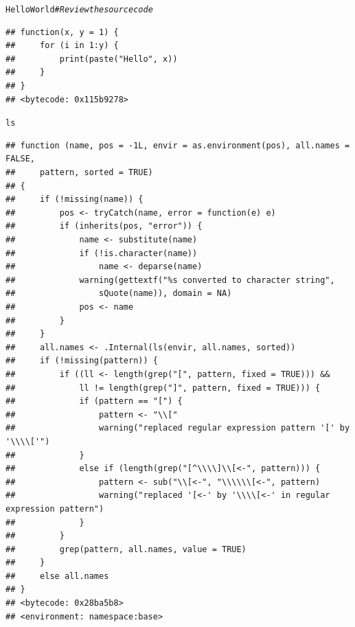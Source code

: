 \documentclass{beamer}\usepackage[]{graphicx}\usepackage[]{color}
\makeatletter
\newcommand{\hlcom}[1]{\textcolor[rgb]{0.678,0.584,0.686}{\textit{#1}}}%
\newcommand{\hlstd}[1]{\textcolor[rgb]{0.345,0.345,0.345}{#1}}%
\newenvironment{kframe}{%
 \def\at@end@of@kframe{}%
 \ifinner\ifhmode%
  \def\at@end@of@kframe{\end{minipage}}%
  \begin{minipage}{\columnwidth}%
 \fi\fi%
 \def\FrameCommand##1{\hskip\@totalleftmargin \hskip-\fboxsep
 \colorbox{shadecolor}{##1}\hskip-\fboxsep
     \hskip-\linewidth \hskip-\@totalleftmargin \hskip\columnwidth}%
 \MakeFramed {\advance\hsize-\width
   \@totalleftmargin\z@ \linewidth\hsize
   \@setminipage}}%
 {\par\unskip\endMakeFramed%
 \at@end@of@kframe}
\newenvironment{knitrout}{}{} %
\makeatother
\begin{document}
\begin{frame}
\begin{knitrout}\scriptsize
{}\color{fgcolor}\begin{kframe}
\begin{alltt}
\hlstd{HelloWorld}  \hlcom{# Review the source code}
\end{alltt}
\begin{verbatim}
## function(x, y = 1) {
##     for (i in 1:y) {
##         print(paste("Hello", x))
##     }
## }
## <bytecode: 0x115b9278>
\end{verbatim}
\begin{alltt}
\hlstd{ls}
\end{alltt}
\begin{verbatim}
## function (name, pos = -1L, envir = as.environment(pos), all.names = FALSE, 
##     pattern, sorted = TRUE) 
## {
##     if (!missing(name)) {
##         pos <- tryCatch(name, error = function(e) e)
##         if (inherits(pos, "error")) {
##             name <- substitute(name)
##             if (!is.character(name)) 
##                 name <- deparse(name)
##             warning(gettextf("%s converted to character string", 
##                 sQuote(name)), domain = NA)
##             pos <- name
##         }
##     }
##     all.names <- .Internal(ls(envir, all.names, sorted))
##     if (!missing(pattern)) {
##         if ((ll <- length(grep("[", pattern, fixed = TRUE))) && 
##             ll != length(grep("]", pattern, fixed = TRUE))) {
##             if (pattern == "[") {
##                 pattern <- "\\["
##                 warning("replaced regular expression pattern '[' by  '\\\\['")
##             }
##             else if (length(grep("[^\\\\]\\[<-", pattern))) {
##                 pattern <- sub("\\[<-", "\\\\\\[<-", pattern)
##                 warning("replaced '[<-' by '\\\\[<-' in regular expression pattern")
##             }
##         }
##         grep(pattern, all.names, value = TRUE)
##     }
##     else all.names
## }
## <bytecode: 0x28ba5b8>
## <environment: namespace:base>
\end{verbatim}
\end{kframe}
\end{knitrout}
\end{frame}
\end{document}
